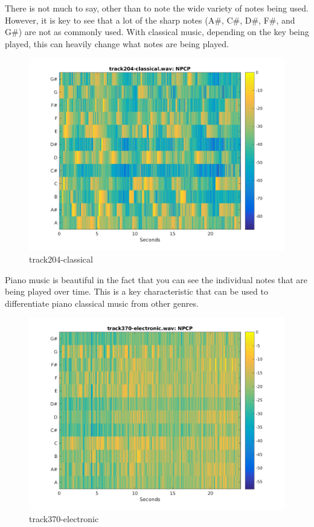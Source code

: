 \documentclass[11pt, a4paper]{article}
\begin{document}
There is not much to say, other than to note the wide variety of notes being used. However, it is key to see that a lot of the sharp notes (A\#, C\#, D\#, F\#, and G\#) are not as commonly used. With classical music, depending on the key being played, this can heavily change what notes are being played. \\


\begin{figure}[H]
    \centering
    \includegraphics[width=.8\textwidth]{track204-classical-NPCP.png}
    \caption{track204-classical}
\end{figure}

Piano music is beautiful in the fact that you can see the individual notes that are being played over time. This is a key characteristic that can be used to differentiate piano classical music from other genres.\\

\begin{figure}[H]
    \centering
    \includegraphics[width=.8\textwidth]{track370-electronic-NPCP.png}
    \caption{track370-electronic}
\end{figure}
\end{document}
